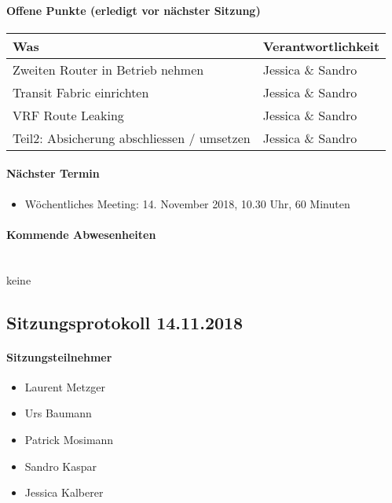 \paragraph{Offene Punkte (erledigt vor nächster Sitzung)} \mbox{}
\begin{table}[H]
	\centering
	\begin{tabularx}{\textwidth}{X | p{4.5cm}}
		\rowcolor{gray!50}
		\textbf{Was} & \textbf{Verantwortlichkeit} \\
		\hline	
		Zweiten Router in Betrieb nehmen & Jessica \& Sandro \\
		Transit Fabric einrichten & Jessica \& Sandro  \\
		VRF Route Leaking & Jessica \& Sandro \\
		Teil2: Absicherung abschliessen / umsetzen & Jessica \& Sandro \\
	\end{tabularx}
	\label{tab:my-label}
\end{table}

\paragraph{Nächster Termin}
\begin{itemize}	
	\item Wöchentliches Meeting: 14. November 2018, 10.30 Uhr, 60 Minuten
\end{itemize}

\paragraph{Kommende Abwesenheiten} \mbox{}\\
keine








\subsection{Sitzungsprotokoll 14.11.2018}

\paragraph{Sitzungsteilnehmer}
\begin{itemize}	
	\item Laurent Metzger
	\item Urs Baumann
	\item Patrick Mosimann
	\item Sandro Kaspar
	\item Jessica Kalberer
\end{itemize}

